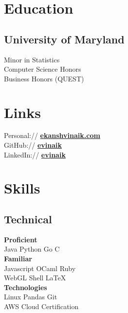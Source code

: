 \documentclass[]{deedy-resume}
\begin{document}
\begin{minipage}[t][.7\textheight][t]{0.33\textwidth} 


\section{Education} 

\subsection{University of Maryland}
Minor in Statistics \\
Computer Science Honors \\
Business Honors (QUEST)  \\
\sectionsep %


\section{Links} 
Personal:// \href{http://ekanshvinaik.com}{\bf ekanshvinaik.com} \\
GitHub:// \href{https://github.com/evinaik}{\bf evinaik} \\
LinkedIn://  \href{https://www.linkedin.com/in/evinaik}{\bf evinaik} \\
\sectionsep %



\section{Skills}
\subsection{Technical}
\textbf{Proficient} \\
Java \textbullet{} Python \textbullet{} Go \textbullet{} C \\
\textbf{Familiar} \\
Javascript \textbullet{}  OCaml \textbullet{} Ruby \\
WebGL \textbullet{} Shell \textbullet{} \LaTeX \\ %
\textbf{Technologies} \\
Linux \textbullet{} Pandas \textbullet{} Git \textbullet{} \\ %
AWS Cloud Certification \\
\sectionsep %


\end{minipage}
\end{document}
